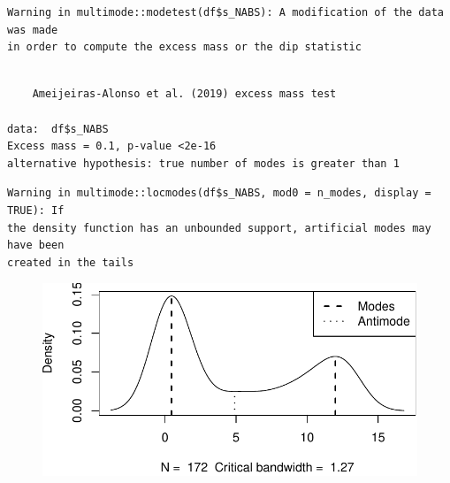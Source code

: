 \documentclass[
  letterpaper,
  DIV=11,
  numbers=noendperiod]{scrreprt}
\newenvironment{Shaded}{\begin{snugshade}}{\end{snugshade}}
\newcommand{\AttributeTok}[1]{\textcolor[rgb]{0.40,0.45,0.13}{#1}}
\newcommand{\ConstantTok}[1]{\textcolor[rgb]{0.56,0.35,0.01}{#1}}
\newcommand{\DecValTok}[1]{\textcolor[rgb]{0.68,0.00,0.00}{#1}}
\newcommand{\FunctionTok}[1]{\textcolor[rgb]{0.28,0.35,0.67}{#1}}
\newcommand{\NormalTok}[1]{\textcolor[rgb]{0.00,0.23,0.31}{#1}}
\newcommand{\OtherTok}[1]{\textcolor[rgb]{0.00,0.23,0.31}{#1}}
\newcommand{\SpecialCharTok}[1]{\textcolor[rgb]{0.37,0.37,0.37}{#1}}
\begin{document}
\begin{verbatim}
Warning in multimode::modetest(df$s_NABS): A modification of the data was made
in order to compute the excess mass or the dip statistic
\end{verbatim}

\begin{verbatim}

    Ameijeiras-Alonso et al. (2019) excess mass test

data:  df$s_NABS
Excess mass = 0.1, p-value <2e-16
alternative hypothesis: true number of modes is greater than 1
\end{verbatim}

\begin{Shaded}
\end{Shaded}

\begin{verbatim}
Warning in multimode::locmodes(df$s_NABS, mod0 = n_modes, display = TRUE): If
the density function has an unbounded support, artificial modes may have been
created in the tails
\end{verbatim}

\begin{figure}[H]

{\centering \includegraphics{analysis/SGC3A/5_sgc3A_exploration_files/figure-pdf/MASS-121-1.pdf}

}

\end{figure}
\end{document}
